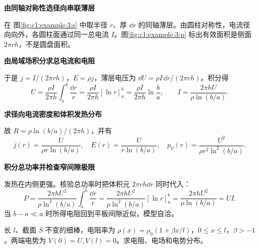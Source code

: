 \begin{solution}\textbf{由同轴对称性选径向串联薄层}\par\nobreak
在 图\ref{fig:c1:example:3:s} 中取半径 $r$、厚 $\dd r$ 的同轴薄层。由圆柱对称性，电流径向向外，各圆柱面通过同一总电流 $I$。图\ref{fig:c1:example:3:p} 标出有效面积是侧面 $2\pi rh$，不是圆盘面积。



\par\medskip{}\noindent\textbf{由局域场积分求总电流和电阻}\par\nobreak
于是 $j=I/(2\pi rh)$，$E=\rho j$，薄层电压为 $\dd U=\rho I\,\dd r/(2\pi rh)$。积分得
\[
 U=\frac{\rho I}{2\pi h}\int_a^b\frac{\dd r}r
 =\frac{\rho I}{2\pi h}[\ln r]_a^b
=\frac{\rho I}{2\pi h}\ln\frac ba,\qquad
 I=\frac{2\pi hU}{\rho\ln(b/a)}.
\]


\par\medskip{}\noindent\textbf{求径向电流密度和体积发热分布}\par\nobreak
故 $R=\rho\ln(b/a)/(2\pi h)$，并有
\[
 j(r)=\frac{U}{\rho r\ln(b/a)},\quad
 E(r)=\frac{U}{r\ln(b/a)},\quad
 p_V(r)=\frac{U^2}{\rho r^2\ln^2(b/a)}.
\]


\par\medskip{}\noindent\textbf{积分总功率并检查窄间隙极限}\par\nobreak
发热在内侧更强。核验总功率时把体积元 $2\pi rh\dd r$ 同时代入：
\[
 P=\frac{2\pi hU^2}{\rho\ln^2(b/a)}\int_a^b\frac{\dd r}{r}
 =\frac{2\pi hU^2}{\rho\ln^2(b/a)}[\ln r]_a^b
 =\frac{2\pi hU^2}{\rho\ln(b/a)}=UI.
\]当 $b-a\ll a$ 时所得电阻回到平板间隙近似，模型自洽。\end{solution}
\begin{question}\begin{example}[电阻率渐变的细棒]\label{c1:example:4}
长 $l$、截面 $S$ 不变的细棒，电阻率为 $\rho(x)=\rho_0(1+\beta x/l)$，$0\le x\le l$，$\beta>-1$。两端电势为 $V(0)=U,V(l)=0$。求电阻、电场和电势分布。
\end{example}
\end{question}
